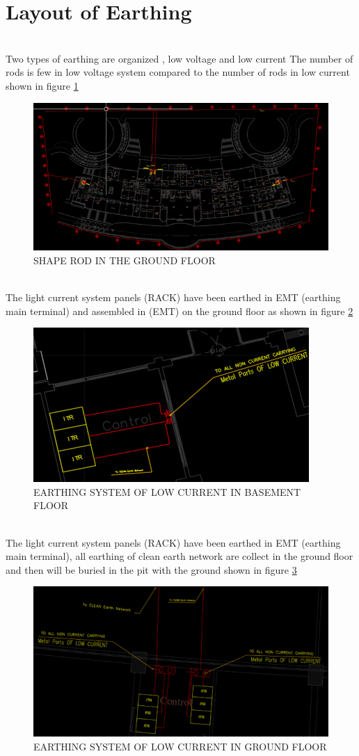 \documentclass[12pt,fleqn]{book} %
\begin{document}
\section{Layout of Earthing}
\\Two types of earthing are organized , low voltage and low current The number of rods is few in low voltage system compared to the number of rods in low current shown in figure \ref{fig:earth 9}
 \begin{figure}[!h]
    \centering
    \includegraphics[width=0.8\linewidth]{earth 9.png}
    \caption{SHAPE ROD IN THE GROUND FLOOR }
    \label{fig:earth 9}
\end{figure}
\\The light current system panels (RACK) have been earthed in EMT (earthing main terminal) and assembled in (EMT) on the ground floor as shown in figure \ref{fig:earth 10}
 \begin{figure}[!h]
    \centering
    \includegraphics[width=0.8\linewidth]{earth 10.png}
    \caption{EARTHING SYSTEM OF LOW CURRENT IN BASEMENT FLOOR }
    \label{fig:earth 10}
\end{figure}
\\The light current system panels (RACK) have been earthed in EMT (earthing main terminal), all earthing of clean earth network are collect in the ground floor and then will be buried in the pit with the ground shown in figure \ref{fig:earth 11}
\begin{figure}[!h]
    \centering
    \includegraphics[width=0.8\linewidth]{earth 11.png}
    \caption{EARTHING SYSTEM OF LOW CURRENT IN GROUND FLOOR }
    \label{fig:earth 11}
\end{figure}
\end{document}

